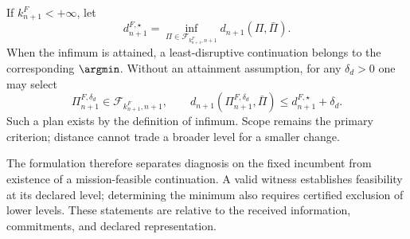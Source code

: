 If $k_{n+1}^F<+\infty$, let
\begin{equation}
d_{n+1}^{F,\star}
=\inf_{\Pi\in\mathcal F_{k_{n+1}^F,n+1}}d_{n+1}(\Pi,\bar\Pi).
\label{eq:minimum_disruption}
\end{equation}
When the infimum is attained, a least-disruptive continuation belongs to
the corresponding $\argmin$. Without an attainment assumption, for any
$\delta_d>0$ one may select
\begin{equation}
\Pi_{n+1}^{F,\delta_d}\in\mathcal F_{k_{n+1}^F,n+1},
\qquad
d_{n+1}(\Pi_{n+1}^{F,\delta_d},\bar\Pi)
\le d_{n+1}^{F,\star}+\delta_d.
\label{eq:secondary_selection}
\end{equation}
Such a plan exists by the definition of infimum. Scope remains the primary
criterion; distance cannot trade a broader level for a smaller change.

The formulation therefore separates diagnosis on the fixed incumbent from
existence of a mission-feasible continuation. A valid witness establishes
feasibility at its declared level; determining the minimum also requires
certified exclusion of lower levels. These statements are relative to the
received information, commitments, and declared representation.
